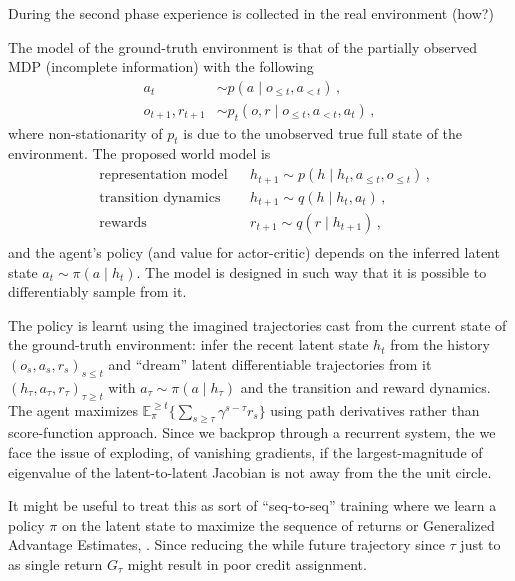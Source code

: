 \documentclass[acmsmall, nonacm]{acmart}
\begin{document}
During the second phase experience is collected in the real environment (how?)

The model of the ground-truth environment is that of the partially observed MDP (incomplete
information) with the following
\begin{align*}
  a_t & \sim p(a \mid o_{\leq t}, a_{< t})
    \,, \\
  o_{t+1}, r_{t+1}
    & \sim p_t(o, r \mid o_{\leq t}, a_{< t}, a_t)
    \,,
\end{align*}
where non-stationarity of $p_t$ is due to the unobserved true full state of the environment.
% 
The proposed world model is
\begin{equation*}
  \begin{aligned}
    & \text{representation model}
      & & h_{t+1} \sim p(h \mid h_t, a_{\leq t}, o_{\leq t})
          \,, \\
    & \text{transition dynamics}
      & & h_{t+1} \sim q(h \mid h_t, a_t)
          \,, \\
    & \text{rewards}
      & & r_{t+1} \sim q(r \mid h_{t+1})
          \,, \\
  \end{aligned}
\end{equation*}
and the agent's policy (and value for actor-critic) depends on the inferred latent state $
  a_t \sim \pi(a\mid h_t)
$. The model is designed in such way that it is possible to differentiably sample from it.

The policy is learnt using the imagined trajectories cast from the current state of the 
ground-truth environment: infer the recent latent state $h_t$ from the history $
  (o_s, a_s, r_s)_{s \leq t}
$ and ``dream'' latent differentiable trajectories from it $
  (h_\tau, a_\tau, r_\tau)_{\tau \geq t}
$ with $a_\tau \sim \pi(a\mid h_\tau)$ and the transition and reward dynamics. The agent
maximizes $
  \mathbb{E}_{\pi}^{\geq t} \bigl\{
      \sum_{s \geq \tau} \gamma^{s - \tau} r_s
    \bigr\}
$ using path derivatives rather than score-function approach.
% 
Since we backprop through a recurrent system, the we face the issue of exploding, of
vanishing gradients, if the largest-magnitude of eigenvalue of the latent-to-latent
Jacobian is not away from the the unit circle.

It might be useful to treat this as sort of ``seq-to-seq'' training where we learn
a policy $\pi$ on the latent state to maximize the sequence of returns or Generalized
Advantage Estimates, \citep{schulman_high-dimensional_2016}. Since reducing the while
future trajectory since $\tau$ just to as single return $G_\tau$ might result in poor
credit assignment.
\end{document}
